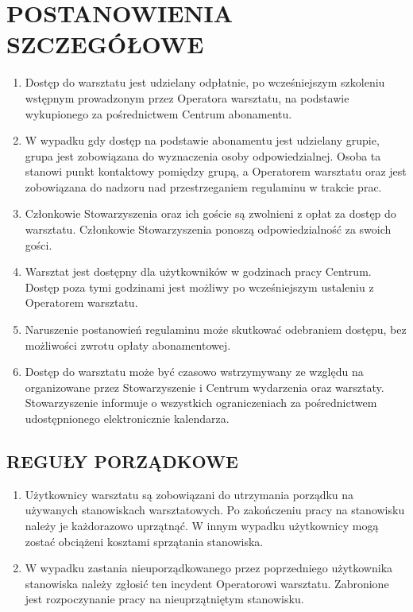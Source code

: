 \documentclass{article}
\begin{document}
\section{POSTANOWIENIA SZCZEGÓŁOWE}
    \begin{enumerate}
    \item Dostęp do warsztatu jest udzielany odpłatnie,  po wcześniejszym szkoleniu wstępnym prowadzonym przez Operatora warsztatu, na podstawie wykupionego za pośrednictwem Centrum abonamentu. 
    \item W wypadku gdy dostęp na podstawie abonamentu jest udzielany grupie, grupa jest zobowiązana do wyznaczenia osoby odpowiedzialnej. Osoba ta stanowi punkt kontaktowy pomiędzy grupą, a Operatorem warsztatu oraz jest zobowiązana do nadzoru nad przestrzeganiem regulaminu w trakcie prac.
    \item Członkowie Stowarzyszenia oraz ich goście są zwolnieni z opłat za dostęp do warsztatu. Członkowie Stowarzyszenia ponoszą odpowiedzialność za swoich gości.
    \item Warsztat jest dostępny dla użytkowników w godzinach pracy Centrum. Dostęp poza tymi godzinami jest możliwy po wcześniejszym ustaleniu z Operatorem warsztatu.
    \item Naruszenie postanowień regulaminu może skutkować odebraniem dostępu, bez możliwości zwrotu opłaty abonamentowej.
    \item Dostęp do warsztatu może być czasowo wstrzymywany ze względu na organizowane przez Stowarzyszenie i Centrum wydarzenia oraz warsztaty. Stowarzyszenie informuje o wszystkich ograniczeniach za pośrednictwem udostępnionego elektronicznie kalendarza.
    \end{enumerate}
\subsection{REGUŁY PORZĄDKOWE}
    \begin{enumerate}
    \item Użytkownicy warsztatu są zobowiązani do utrzymania porządku na używanych stanowiskach warsztatowych. Po zakończeniu pracy na stanowisku należy je każdorazowo uprzątnąć. W innym wypadku użytkownicy mogą zostać obciążeni kosztami sprzątania stanowiska.
    \item W wypadku zastania nieuporządkowanego przez poprzedniego użytkownika stanowiska należy zgłosić ten incydent Operatorowi warsztatu. Zabronione jest rozpoczynanie pracy na nieuprzątniętym stanowisku.
    \end{enumerate}
\end{document}
